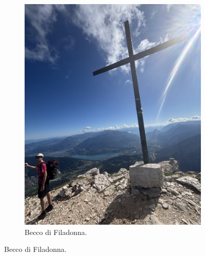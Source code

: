 \documentclass{article}
\begin{document}
\begin{figure}[htbp!]
\begin{subfigure}[b]{0.45\textwidth}
        \includegraphics[width=\textwidth]{images/foto_croce.jpg}
        \caption{Becco di Filadonna.}
    \end{subfigure}
\end{figure}
\end{document}
